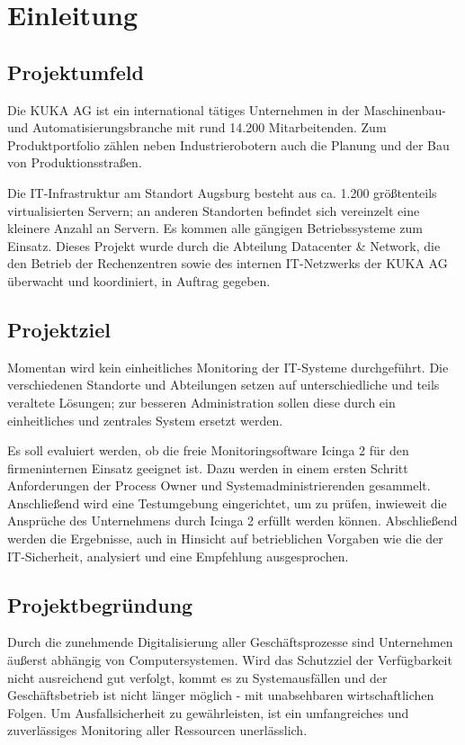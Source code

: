 \section{Einleitung}
\label{sec:Einleitung}

\subsection{Projektumfeld} 
\label{sec:Projektumfeld}
Die KUKA AG ist ein international tätiges Unternehmen in der Maschinenbau- und Automatisierungsbranche mit rund 14.200 Mitarbeitenden. Zum Produktportfolio zählen neben Industrierobotern auch die Planung und der Bau von Produktionsstraßen.

Die IT-Infrastruktur am Standort Augsburg besteht aus ca. 1.200 größtenteils virtualisierten Servern; an anderen Standorten befindet sich vereinzelt eine kleinere Anzahl an Servern. Es kommen alle gängigen Betriebssysteme zum Einsatz. Dieses Projekt wurde durch die Abteilung \glqq Datacenter \& Network\grqq{}, die den Betrieb der Rechenzentren sowie des internen IT-Netzwerks der KUKA AG überwacht und koordiniert, in Auftrag gegeben.

\subsection{Projektziel} 
\label{sec:Projektziel}
Momentan wird kein einheitliches Monitoring der IT-Systeme durchgeführt. Die verschiedenen Standorte und Abteilungen setzen auf unterschiedliche und teils veraltete Lösungen; zur besseren Administration sollen diese durch ein einheitliches und zentrales System ersetzt werden.

Es soll evaluiert werden, ob die freie Monitoringsoftware \glqq Icinga 2\grqq{} für den firmeninternen Einsatz geeignet ist. Dazu werden in einem ersten Schritt Anforderungen der Process Owner und Systemadministrierenden gesammelt. Anschließend wird eine Testumgebung eingerichtet, um zu prüfen, inwieweit die Ansprüche des Unternehmens durch \glqq Icinga 2\grqq{} erfüllt werden können. Abschließend werden die Ergebnisse, auch in Hinsicht auf betrieblichen Vorgaben wie die der IT-Sicherheit, analysiert und eine Empfehlung ausgesprochen.

\subsection{Projektbegründung} 
\label{sec:Projektbegruendung}
Durch die zunehmende Digitalisierung aller Geschäftsprozesse sind Unternehmen äußerst abhängig von Computersystemen. Wird das Schutzziel der Verfügbarkeit nicht ausreichend gut verfolgt, kommt es zu Systemausfällen und der Geschäftsbetrieb ist nicht länger möglich - mit unabsehbaren wirtschaftlichen Folgen. Um Ausfallsicherheit zu gewährleisten, ist ein umfangreiches und zuverlässiges Monitoring aller Ressourcen unerlässlich.

